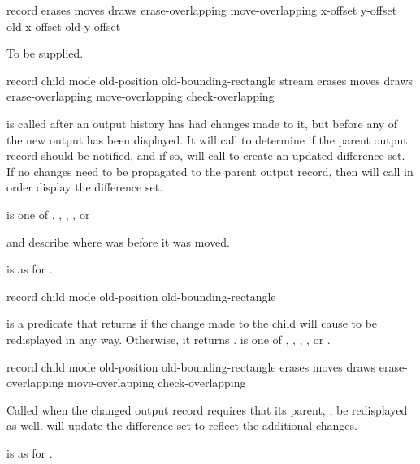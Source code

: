  {record erases moves draws erase-overlapping move-overlapping
                                \optional x-offset y-offset old-x-offset old-y-offset}

 {To be supplied.}


            {record child mode old-position old-bounding-rectangle stream
             \optional erases moves draws erase-overlapping move-overlapping
             \key check-overlapping}

 is called after an output history has had
changes made to it, but before any of the new output has been displayed.  It
will call  to determine if the parent
output record should be notified, and if so, will call
 to create an updated difference set.  If no
changes need to be propagated to the parent output record, then
 will call  in
order display the difference set.

 is one of , , , , or

 and  describe where 
was before it was moved.

 is as for .


 {record child mode 
                                                 old-position old-bounding-rectangle}

 is a predicate that returns 
if the change made to the child will cause  to be redisplayed in any
way.  Otherwise, it returns .   is one of ,
, , , or .

            {record child mode 
             \optional old-position old-bounding-rectangle
                       erases moves draws erase-overlapping move-overlapping check-overlapping}

Called when the changed  output record requires that its parent,
, be redisplayed as well.  
will update the difference set to reflect the additional changes.

 is as for .


